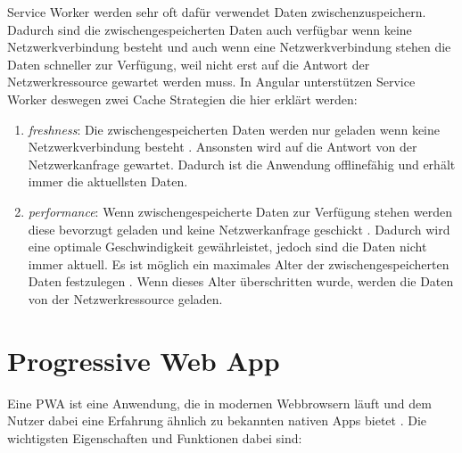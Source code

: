 
Service Worker werden sehr oft dafür verwendet Daten zwischenzuspeichern. Dadurch sind die zwischengespeicherten Daten auch verfügbar wenn keine Netzwerkverbindung besteht und auch wenn eine Netzwerkverbindung stehen die Daten schneller zur Verfügung, weil nicht erst auf die Antwort der Netzwerkressource gewartet werden muss. In Angular unterstützen Service Worker deswegen zwei Cache Strategien die hier erklärt werden:

\begin{enumerate}
\item \textit{freshness}: Die zwischengespeicherten Daten werden nur geladen wenn keine Netzwerkverbindung besteht \autocite{angular-service-worker}. Ansonsten wird auf die Antwort von der Netzwerkanfrage gewartet. Dadurch ist die Anwendung offlinefähig und erhält immer die aktuellsten Daten.
\item \textit{performance}: Wenn zwischengespeicherte Daten zur Verfügung stehen werden diese bevorzugt geladen und keine Netzwerkanfrage geschickt \autocite{angular-service-worker}. Dadurch wird eine optimale Geschwindigkeit gewährleistet, jedoch sind die Daten nicht immer aktuell. Es ist möglich ein maximales Alter der zwischengespeicherten Daten festzulegen \autocite{angular-service-worker}. Wenn dieses Alter überschritten wurde, werden die Daten von der Netzwerkressource geladen.
\end{enumerate}

\section{Progressive Web App}
Eine \ac{PWA} ist eine Anwendung, die in modernen Webbrowsern läuft und dem Nutzer dabei eine Erfahrung ähnlich zu bekannten nativen Apps bietet \autocite{Sheppard2017} \autocite{Rojas2020}. Die wichtigsten Eigenschaften und Funktionen dabei sind:

